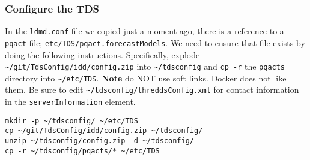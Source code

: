 \documentclass[onecolumn,9pt]{article}
\begin{document}
\subsubsection{Configure the TDS}
\label{sec:orgheadline24}

In the \texttt{ldmd.conf} file we copied just a moment ago, there is a reference to a \texttt{pqact} file; \texttt{etc/TDS/pqact.forecastModels}. We need to ensure that file exists by doing the following instructions. Specifically, explode \texttt{\textasciitilde{}/git/TdsConfig/idd/config.zip} into \texttt{\textasciitilde{}/tdsconfig} and \texttt{cp -r} the \texttt{pqacts} directory into \texttt{\textasciitilde{}/etc/TDS}. \textbf{Note} do NOT use soft links. Docker does not like them. Be sure to edit \texttt{\textasciitilde{}/tdsconfig/threddsConfig.xml} for contact information in the \texttt{serverInformation} element.

\lstset{frame=lines,basicstyle=\footnotesize,numbers=left,numberstyle=\tiny,language=sh,label= ,caption= ,captionpos=b}
\begin{lstlisting}
mkdir -p ~/tdsconfig/ ~/etc/TDS
cp ~/git/TdsConfig/idd/config.zip ~/tdsconfig/
unzip ~/tdsconfig/config.zip -d ~/tdsconfig/
cp -r ~/tdsconfig/pqacts/* ~/etc/TDS
\end{lstlisting}
\end{document}
